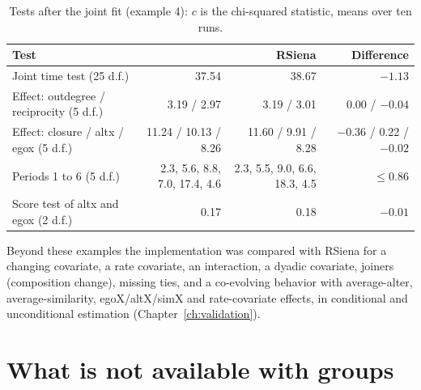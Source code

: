 \begin{table}[ht]
\centering\small
\caption{Tests after the joint fit (example 4): $c$ is the chi-squared statistic, means over ten runs.}\label{tab:groups-tests}
\setlength{\tabcolsep}{3pt}\scriptsize
\begin{tabular}{@{}lrrr@{}}
\toprule
Test & \nwsaom{} & RSiena & Difference\\
\midrule
Joint time test (25 d.f.) & 37.54 & 38.67 & $-1.13$\\
Effect: outdegree / reciprocity (5 d.f.) & 3.19 / 2.97 & 3.19 / 3.01 & 0.00 / $-0.04$\\
Effect: closure / altx / egox (5 d.f.) & 11.24 / 10.13 / 8.26 & 11.60 / 9.91 / 8.28 & $-0.36$ / 0.22 / $-0.02$\\
Periods 1 to 6 (5 d.f.) & 2.3, 5.6, 8.8, 7.0, 17.4, 4.6 & 2.3, 5.5, 9.0, 6.6, 18.3, 4.5 & $\le 0.86$\\
Score test of altx and egox (2 d.f.) & 0.17 & 0.18 & $-0.01$\\
\bottomrule
\end{tabular}
\end{table}

Beyond these examples the implementation was compared with RSiena for a changing covariate, a rate covariate, an interaction, a dyadic covariate, joiners (composition change), missing ties, and a co-evolving behavior with average-alter, average-similarity, egoX/altX/simX and rate-covariate effects, in conditional and unconditional estimation (Chapter~\ref{ch:validation}).

\section{What is not available with groups}\label{sec:groups-limits}

